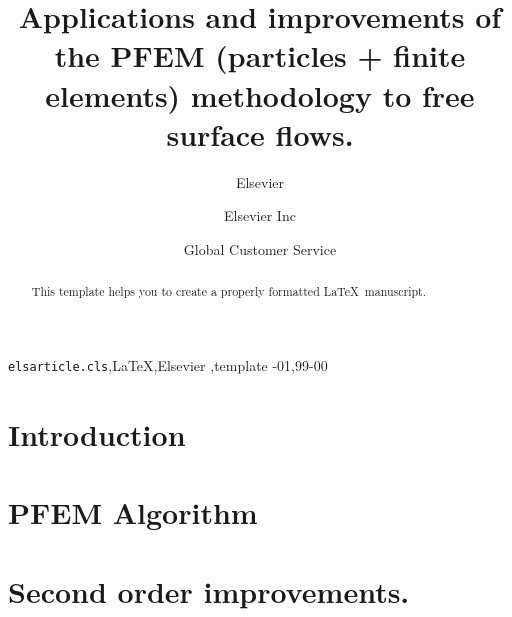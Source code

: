 \documentclass[review]{elsarticle}
\begin{document}
\begin{frontmatter}

\title{Applications and improvements of the PFEM (particles + finite elements) methodology to free surface flows.}

\author{Elsevier}
\address{Radarweg 29, Amsterdam}

\author[mymainaddress,mysecondaryaddress]{Elsevier Inc}

\author[mysecondaryaddress]{Global Customer Service}

\address[mymainaddress]{1600 John F Kennedy Boulevard, Philadelphia}
\address[mysecondaryaddress]{360 Park Avenue South, New York}

\begin{abstract}
This template helps you to create a properly formatted \LaTeX\ manuscript.
\end{abstract}

\begin{keyword}
\texttt{elsarticle.cls}\sep \LaTeX\sep Elsevier \sep template
-01\sep  99-00
\end{keyword}

\end{frontmatter}

\linenumbers


\section{Introduction}\label{Intro}




\section{PFEM Algorithm}\label{PFEM_Algorithm}




\section{Second order improvements.}\label{Second_order}

\end{document}
